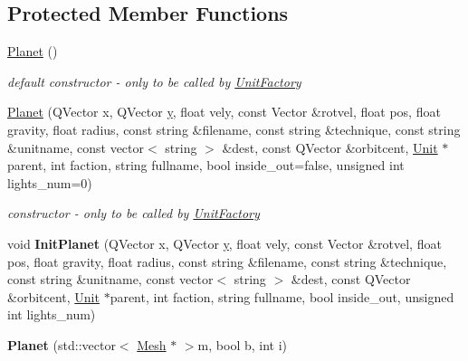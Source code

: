 \subsection*{Protected Member Functions}
\begin{DoxyCompactItemize}
\item 
\hyperlink{classPlanet_ac88200b337a62e1377858e3116f9412b}{Planet} ()\hypertarget{classPlanet_ac88200b337a62e1377858e3116f9412b}{}\label{classPlanet_ac88200b337a62e1377858e3116f9412b}

\begin{DoxyCompactList}\small\item\em default constructor -\/ only to be called by \hyperlink{classUnitFactory}{Unit\+Factory} \end{DoxyCompactList}\item 
\hyperlink{classPlanet_af0450083854f0da7c061f79a92e14a31}{Planet} (Q\+Vector x, Q\+Vector \hyperlink{IceUtils_8h_aa7ffaed69623192258fb8679569ff9ba}{y}, float vely, const Vector \&rotvel, float pos, float gravity, float radius, const string \&filename, const string \&technique, const string \&unitname, const vector$<$ string $>$ \&dest, const Q\+Vector \&orbitcent, \hyperlink{classUnit}{Unit} $\ast$parent, int faction, string fullname, bool inside\+\_\+out=false, unsigned int lights\+\_\+num=0)\hypertarget{classPlanet_af0450083854f0da7c061f79a92e14a31}{}\label{classPlanet_af0450083854f0da7c061f79a92e14a31}

\begin{DoxyCompactList}\small\item\em constructor -\/ only to be called by \hyperlink{classUnitFactory}{Unit\+Factory} \end{DoxyCompactList}\item 
void {\bfseries Init\+Planet} (Q\+Vector x, Q\+Vector \hyperlink{IceUtils_8h_aa7ffaed69623192258fb8679569ff9ba}{y}, float vely, const Vector \&rotvel, float pos, float gravity, float radius, const string \&filename, const string \&technique, const string \&unitname, const vector$<$ string $>$ \&dest, const Q\+Vector \&orbitcent, \hyperlink{classUnit}{Unit} $\ast$parent, int faction, string fullname, bool inside\+\_\+out, unsigned int lights\+\_\+num)\hypertarget{classPlanet_a0fa8d911e00f5043b0a3b51173082079}{}\label{classPlanet_a0fa8d911e00f5043b0a3b51173082079}

\item 
{\bfseries Planet} (std\+::vector$<$ \hyperlink{classMesh}{Mesh} $\ast$ $>$m, bool b, int i)\hypertarget{classPlanet_a1c8e9e54c125a63264fd15447e9bdb6e}{}\label{classPlanet_a1c8e9e54c125a63264fd15447e9bdb6e}

\end{DoxyCompactItemize}
